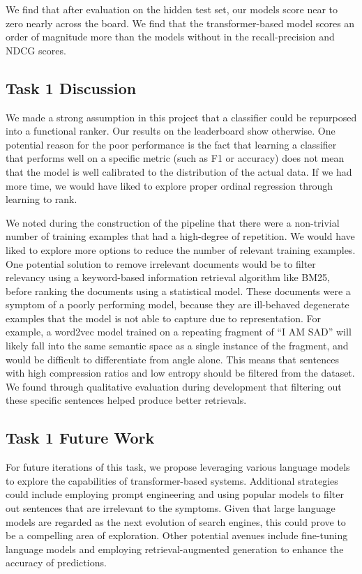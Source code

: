 \documentclass[]{style/ceurart}
\begin{document}
We find that after evaluation on the hidden test set, our models score near to zero nearly across the board. We find that the transformer-based model scores an order of magnitude more than the models without in the recall-precision and NDCG scores. 

\subsection{Task 1 Discussion}

We made a strong assumption in this project that a classifier could be repurposed into a functional ranker. 
Our results on the leaderboard show otherwise. 
One potential reason for the poor performance is the fact that learning a classifier that performs well on a specific metric (such as F1 or accuracy) does not mean that the model is well calibrated to the distribution of the actual data. 
If we had more time, we would have liked to explore proper ordinal regression through learning to rank.

We noted during the construction of the pipeline that there were a non-trivial number of training examples that had a high-degree of repetition. We would have liked to explore more options to reduce the number of relevant training examples. One potential solution to remove irrelevant documents would be to filter relevancy using a keyword-based information retrieval algorithm like BM25, before ranking the documents using a statistical model. These documents were a symptom of a poorly performing model, because they are ill-behaved degenerate examples that the model is not able to capture due to representation. For example, a word2vec model trained on a repeating fragment of “I AM SAD” will likely fall into the same semantic space as a single instance of the fragment, and would be difficult to differentiate from angle alone. This means that sentences with high compression ratios and low entropy should be filtered from the dataset. We found through qualitative evaluation during development that filtering out these specific sentences helped produce better retrievals.	


\subsection{Task 1 Future Work}

For future iterations of this task, we propose leveraging various language models to explore the capabilities of transformer-based systems. Additional strategies could include employing prompt engineering and using popular models to filter out sentences that are irrelevant to the symptoms. Given that large language models are regarded as the next evolution of search engines, this could prove to be a compelling area of exploration. Other potential avenues include fine-tuning language models and employing retrieval-augmented generation to enhance the accuracy of predictions.
\end{document}

